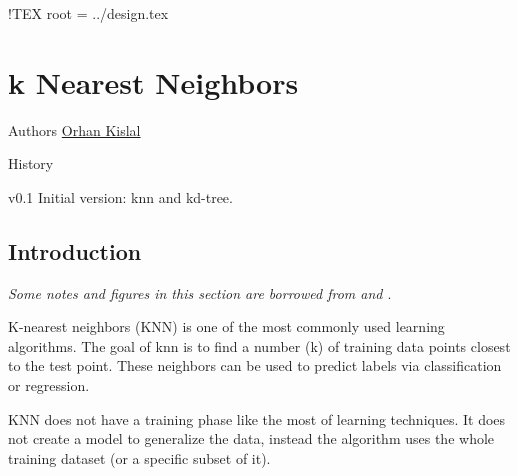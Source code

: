 


!TEX root = ../design.tex


\chapter[k Nearest Neighbors]{k Nearest Neighbors}

\begin{moduleinfo}
\item[Authors] \href{mailto:okislal@pivotal.io}{Orhan Kislal}

\item[History]
	\begin{modulehistory}
		\item[v0.1] Initial version: knn and kd-tree.
	\end{modulehistory}
\end{moduleinfo}


\section{Introduction} %
\label{sec:knn_introduction}

\emph{Some notes and figures in this section are borrowed from \cite{medium_knn} and \cite{point_knn}}.

K-nearest neighbors (KNN) is one of the most commonly used learning
algorithms. The goal of knn is to find a number (k) of training data points
closest to the test point. These neighbors can be used to predict labels via
classification or regression.

KNN does not have a training phase like the most of learning techniques. It
does not create a model to generalize the data, instead the algorithm uses the
whole training dataset (or a specific subset of it).

